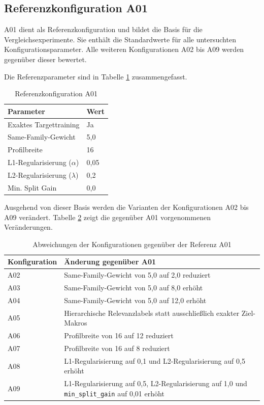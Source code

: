 \subsection{Referenzkonfiguration A01}

A01 dient als Referenzkonfiguration und bildet die Basis für die Vergleichsexperimente. Sie enthält die Standardwerte für alle untersuchten Konfigurationsparameter.
Alle weiteren Konfigurationen A02 bis A09 werden gegenüber dieser bewertet.

Die Referenzparameter sind in Tabelle \ref{tab:a01_referenz} zusammengefasst.

\begin{table}[H] 
    \centering 
    \caption{Referenzkonfiguration A01} 
    \label{tab:a01_referenz} 
    \begin{tabular}{ll} 
        \toprule 
        \textbf{Parameter} & \textbf{Wert} \\ 
        \midrule 
        Exaktes Targettraining & Ja \\ 
        Same-Family-Gewicht & 5,0 \\ 
        Profilbreite & 16 \\ 
        L1-Regularisierung ($\alpha$) & 0,05 \\ 
        L2-Regularisierung ($\lambda$) & 0,2 \\ 
        Min. Split Gain & 0,0 \\ 
        \bottomrule 
    \end{tabular} 
\end{table}

Ausgehend von dieser Basis werden die Varianten der Konfigurationen A02 bis A09 verändert.
Tabelle \ref{tab:konfigurationsabweichungen} zeigt die gegenüber A01 vorgenommenen Veränderungen. 

\begin{table}[H] 
    \centering 
    \caption{Abweichungen der Konfigurationen gegenüber der Referenz A01} 
    \label{tab:konfigurationsabweichungen} 
    \begin{tabular}{lp{8cm}} 
        \toprule 
        \textbf{Konfiguration} & \textbf{Änderung gegenüber A01} \\ 
        \midrule 
        A02 & Same-Family-Gewicht von 5,0 auf 2,0 reduziert \\ 
        A03 & Same-Family-Gewicht von 5,0 auf 8,0 erhöht \\ 
        A04 & Same-Family-Gewicht von 5,0 auf 12,0 erhöht \\ 
        A05 & Hierarchische Relevanzlabels statt ausschließlich exakter Ziel-Makros \\ 
        A06 & Profilbreite von 16 auf 12 reduziert \\ 
        A07 & Profilbreite von 16 auf 8 reduziert \\ 
        A08 & L1-Regularisierung auf 0,1 und L2-Regularisierung auf 0,5 erhöht \\ 
        A09 & L1-Regularisierung auf 0,5, L2-Regularisierung auf 1,0 und \texttt{min\_split\_gain} auf 0,01 erhöht \\ 
        \bottomrule 
    \end{tabular} 
\end{table}

